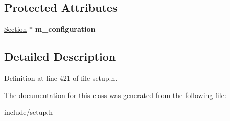 \subsection*{Protected Attributes}
\begin{DoxyCompactItemize}
\item 
\hypertarget{classModule__base_aceab15faaa79b216f6d417b0c80fdce6}{\hyperlink{classSection}{Section} $\ast$ {\bfseries m\-\_\-configuration}}\label{classModule__base_aceab15faaa79b216f6d417b0c80fdce6}

\end{DoxyCompactItemize}


\subsection{Detailed Description}


Definition at line 421 of file setup.\-h.



The documentation for this class was generated from the following file\-:\begin{DoxyCompactItemize}
\item 
include/setup.\-h\end{DoxyCompactItemize}
